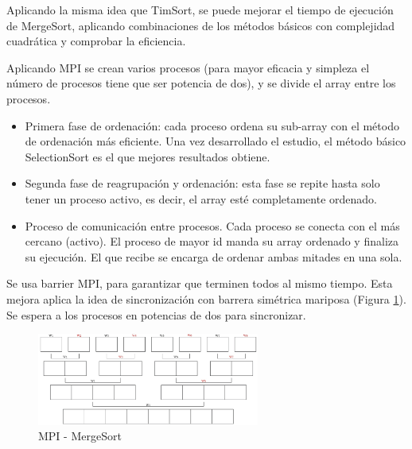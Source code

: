 	Aplicando la misma idea que TimSort, se puede mejorar el tiempo de ejecución de MergeSort, aplicando combinaciones de los métodos básicos con complejidad cuadrática y comprobar la eficiencia.
	
	
	Aplicando MPI se crean varios procesos (para mayor eficacia y simpleza el número de procesos tiene que ser potencia de dos), y se divide el array entre los procesos.
	\begin{itemize}
		\item Primera fase de ordenación: cada proceso ordena su sub-array con el método de ordenación más eficiente. Una vez desarrollado el estudio, el método básico SelectionSort es el que mejores resultados obtiene.
		\item Segunda fase de reagrupación y ordenación: esta fase se repite hasta solo tener un proceso activo, es decir, el array esté completamente ordenado.
		\item Proceso de comunicación entre procesos. Cada proceso se conecta con el más cercano (activo). 
		El proceso de mayor id manda su array ordenado y finaliza su ejecución. El que recibe se encarga de ordenar ambas mitades en una sola.
	\end{itemize}
	
	
	Se usa barrier MPI, para garantizar que terminen todos al mismo tiempo. Esta mejora aplica la idea de sincronización con barrera simétrica mariposa (Figura \ref{fig:mergesortmpi}). Se espera a los procesos en potencias de dos para sincronizar.  
	
	\begin{figure}[!h]
		\centering
		\includegraphics[width=0.65\textwidth]{images/chapter_3/mergesort_mpi}
		\caption{MPI - MergeSort}
		\label{fig:mergesortmpi}
	\end{figure}



